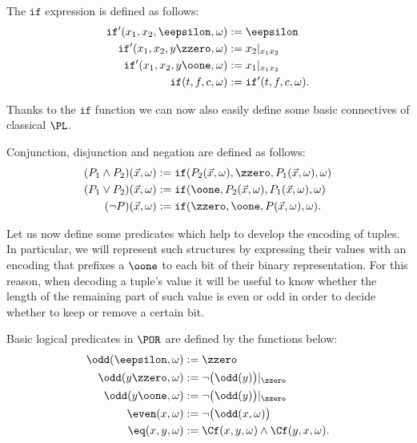 \begin{defn}
The $\mathtt{if}$ expression is defined as follows:
\begin{align*}
\mathtt{if}'(x_1,x_2,\eepsilon, \omega) &:= \eepsilon \\
\mathtt{if}'(x_1,x_2,y\zzero, \omega) &:= x_2|_{x_1x_2} \\
\mathtt{if}'(x_1,x_2,y\oone, \omega) &:= x_1|_{x_1x_2} \\
\mathtt{if}(t,f,c,\omega) &:= \mathtt{if}'(t,f,c,\omega).
\end{align*}
\end{defn}
%
%
\noindent
Thanks to the $\mathtt{if}$ function we can now
also easily define some basic connectives
of classical $\PL$.

\begin{defn}
Conjunction, disjunction and negation are
defined as follows:
\begin{align*}
(P_1\wedge P_2)(\vec{x},\omega) &:=
\mathtt{if}(P_2(\vec{x},\omega),\zzero,P_1(\vec{x},\omega),
\omega) \\
%
(P_1\vee P_2)(\vec{x},\omega) &:= \mathtt{if}(\oone,
P_2(\vec{x},\omega), P_1(\vec{x},\omega), \omega) \\
%
(\neg P)(\vec{x},\omega) &:= \mathtt{if}(\zzero,\oone,P(\vec{x},\omega),
\omega).
\end{align*}
\end{defn}

Let us now define some predicates which
help to develop the encoding of tuples.
In particular, we will represent
such structures by expressing their values
with an encoding that prefixes a $\oone$
to each bit of their binary representation.
For this reason, when decoding
a tuple's value it will be useful
to know whether the length of the remaining
part of such value is even or odd
in order to decide whether to keep or remove
a certain bit.

\begin{defn}
{Basic logical predicates in $\POR$
are defined by the functions below:}
\begin{align*}
\odd(\eepsilon,\omega) &:= \zzero \\
%
\odd(y\zzero,\omega) &:= \neg\big(\odd(y)\big)|_\zzero \\
%
\odd(y\oone, \omega) &:=
\neg\big(\odd(y)\big)|_\zzero \\
%
\even(x,\omega) &:= \neg\big(\odd(x,\omega)\big) \\
%
\eq(x,y,\omega) &:= {\Cf(x,y,\omega) \wedge
\Cf(y,x,\omega)}.
\end{align*}
\end{defn}
%
%

